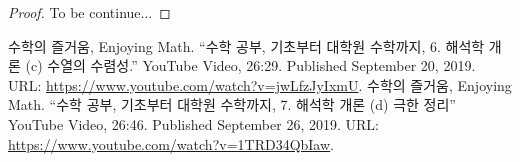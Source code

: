 \documentclass[11pt,openany]{article}
\begin{document}
\vfill
{}
\begin{proof}
	To be continue...
\end{proof}


\vfill
\begin{thebibliography}{9}
	수학의 즐거움, Enjoying Math. ``수학 공부, 기초부터 대학원 수학까지, 6. 해석학 개론 (c) 수열의 수렴성.'' YouTube Video, 26:29. Published 
	September 20, 2019. URL: \url{https://www.youtube.com/watch?v=jwLfzJyIxmU}.
	수학의 즐거움, Enjoying Math. ``수학 공부, 기초부터 대학원 수학까지, 7. 해석학 개론 (d) 극한 정리'' YouTube Video, 26:46. Published 
	September 26, 2019. URL: \url{https://www.youtube.com/watch?v=1TRD34QbIaw}.
\end{thebibliography}

\end{document}

